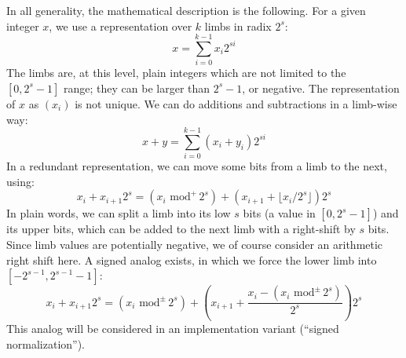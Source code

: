 \documentclass{llncs}
\newcommand{\umod}[2]{#1 \,\,\text{mod}^{+}\, #2}
\newcommand{\smod}[2]{#1 \,\,\text{mod}^{\pm}\, #2}
\begin{document}
In all generality, the mathematical description is the following. For
a given integer $x$, we use a representation over $k$ limbs in radix
$2^s$:
\begin{equation*}
    x = \sum_{i=0}^{k-1} x_i 2^{si}
\end{equation*}
The limbs are, at this level, plain integers which are not limited to the
$[0, 2^s - 1]$ range; they can be larger than $2^s - 1$, or negative. The
representation of $x$ as $(x_i)$ is not unique. We can do additions and
subtractions in a limb-wise way:
\begin{equation*}
    x + y = \sum_{i=0}^{k-1} (x_i + y_i) 2^{si}
\end{equation*}
In a redundant representation, we can move some bits from a limb to the
next, using:
\begin{equation*}
    x_i + x_{i+1} 2^s = (\umod{x_i}{2^s}) + (x_{i+1} + \lfloor x_i/2^s \rfloor) 2^s
\end{equation*}
In plain words, we can split a limb into its low $s$ bits (a value in
$[0, 2^s - 1]$) and its upper bits, which can be added to the next limb
with a right-shift by $s$ bits. Since limb values are potentially
negative, we of course consider an arithmetic right shift here. A signed
analog exists, in which we force the lower limb into $[-2^{s-1}, 2^{s-1}
- 1]$:
\begin{equation*}
    x_i + x_{i+1} 2^s = (\smod{x_i}{2^s}) + \left(x_{i+1} + \frac{x_i - (\smod{x_i}{2^s})}{2^s}\right) 2^s
\end{equation*}
This analog will be considered in an implementation variant (``signed
normalization'').
\end{document}
